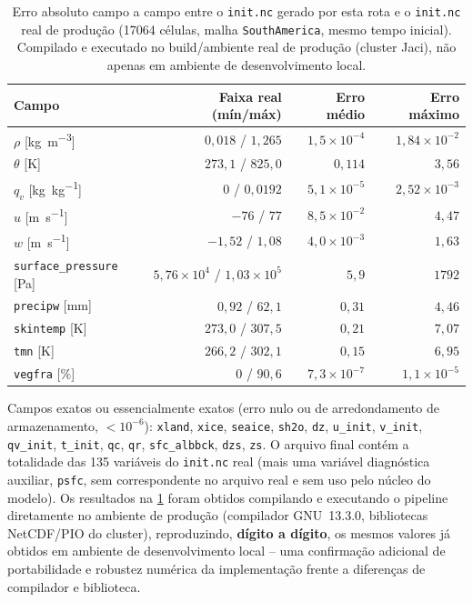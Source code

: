 \begin{table}[H]
\centering
\caption{Erro absoluto campo a campo entre o \texttt{init.nc} gerado por
  esta rota e o \texttt{init.nc} real de produção (17064 células, malha
  \texttt{SouthAmerica}, mesmo tempo inicial). Compilado e executado no
  build/ambiente real de produção (cluster Jaci), não apenas em ambiente
  de desenvolvimento local.}
\label{tab:validacao_init}
\begin{tabular}{@{}lrrr@{}}
\toprule
Campo & Faixa real (mín/máx) & Erro médio & Erro máximo \\
\midrule
$\rho$ [\si{\kilo\gram\per\meter\cubed}] & $0{,}018$ / $1{,}265$ & $1{,}5\times10^{-4}$ & $1{,}84\times10^{-2}$ \\
$\theta$ [\si{\kelvin}] & $273{,}1$ / $825{,}0$ & $0{,}114$ & $3{,}56$ \\
$q_v$ [\si{\kilo\gram\per\kilo\gram}] & $0$ / $0{,}0192$ & $5{,}1\times10^{-5}$ & $2{,}52\times10^{-3}$ \\
$u$ [\si{\meter\per\second}] & $-76$ / $77$ & $8{,}5\times10^{-2}$ & $4{,}47$ \\
$w$ [\si{\meter\per\second}] & $-1{,}52$ / $1{,}08$ & $4{,}0\times10^{-3}$ & $1{,}63$ \\
\texttt{surface\_pressure} [\si{\pascal}] & $5{,}76\times10^4$ / $1{,}03\times10^5$ & $5{,}9$ & $1792$ \\
\texttt{precipw} [\si{\milli\meter}] & $0{,}92$ / $62{,}1$ & $0{,}31$ & $4{,}46$ \\
\texttt{skintemp} [\si{\kelvin}] & $273{,}0$ / $307{,}5$ & $0{,}21$ & $7{,}07$ \\
\texttt{tmn} [\si{\kelvin}] & $266{,}2$ / $302{,}1$ & $0{,}15$ & $6{,}95$ \\
\texttt{vegfra} [\si{\percent}] & $0$ / $90{,}6$ & $7{,}3\times10^{-7}$ & $1{,}1\times10^{-5}$ \\
\bottomrule
\end{tabular}
\end{table}

Campos exatos ou essencialmente exatos (erro nulo ou de arredondamento de
armazenamento, $<10^{-6}$): \texttt{xland}, \texttt{xice},
\texttt{seaice}, \texttt{sh2o}, \texttt{dz}, \texttt{u\_init},
\texttt{v\_init}, \texttt{qv\_init}, \texttt{t\_init}, \texttt{qc},
\texttt{qr}, \texttt{sfc\_albbck}, \texttt{dzs}, \texttt{zs}. O arquivo
final contém a totalidade das 135 variáveis do \texttt{init.nc} real
(mais uma variável diagnóstica auxiliar, \texttt{psfc}, sem
correspondente no arquivo real e sem uso pelo núcleo do modelo). Os
resultados na \cref{tab:validacao_init} foram obtidos compilando e
executando o pipeline diretamente no ambiente de produção (compilador
GNU~13.3.0, bibliotecas NetCDF/PIO do cluster), reproduzindo,
\textbf{dígito a dígito}, os mesmos valores já obtidos em ambiente de
desenvolvimento local -- uma confirmação adicional de portabilidade e
robustez numérica da implementação frente a diferenças de compilador e
biblioteca.


